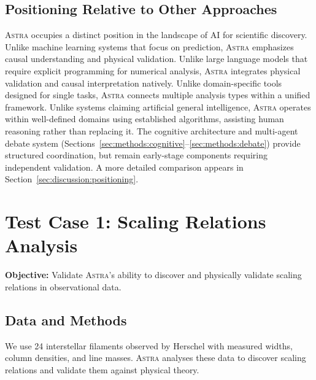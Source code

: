 \documentclass[usenatbib]{rasti}
\newcommand{\astra}{\textsc{Astra}\xspace}
\begin{document}
\subsection{Positioning Relative to Other Approaches}
\label{sec:methods:positioning}

\astra occupies a distinct position in the landscape of AI for scientific discovery.
Unlike machine learning systems that focus on prediction, \astra emphasizes causal understanding and physical validation.
Unlike large language models that require explicit programming for numerical analysis, \astra integrates physical validation and causal interpretation natively.
Unlike domain-specific tools designed for single tasks, \astra connects multiple analysis types within a unified framework.
Unlike systems claiming artificial general intelligence, \astra operates within well-defined domains using established algorithms, assisting human reasoning rather than replacing it.
The cognitive architecture and multi-agent debate system (Sections~\ref{sec:methods:cognitive}--\ref{sec:methods:debate}) provide structured coordination, but remain early-stage components requiring independent validation.
A more detailed comparison appears in Section~\ref{sec:discussion:positioning}.

\section{Test Case 1: Scaling Relations Analysis}
\label{sec:tc1}

\textbf{Objective:} Validate \astra's ability to discover and physically validate scaling relations in observational data.

\subsection{Data and Methods}
\label{sec:tc1:data}

We use 24 interstellar filaments observed by Herschel \citep{Arzoumanian2011,Arzoumanian2019} with measured widths, column densities, and line masses.
\astra analyses these data to discover scaling relations and validate them against physical theory.
\end{document}
